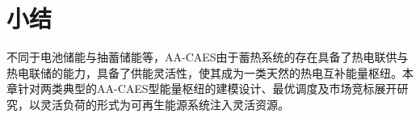 

\section{小结}
不同于电池储能与抽蓄储能等，AA-CAES由于蓄热系统的存在具备了热电联供与热电联储的能力，具备了供能灵活性，使其成为一类天然的热电互补能量枢纽。本章针对两类典型的AA-CAES型能量枢纽的建模设计、最优调度及市场竞标展开研究，以灵活负荷的形式为可再生能源系统注入灵活资源。

